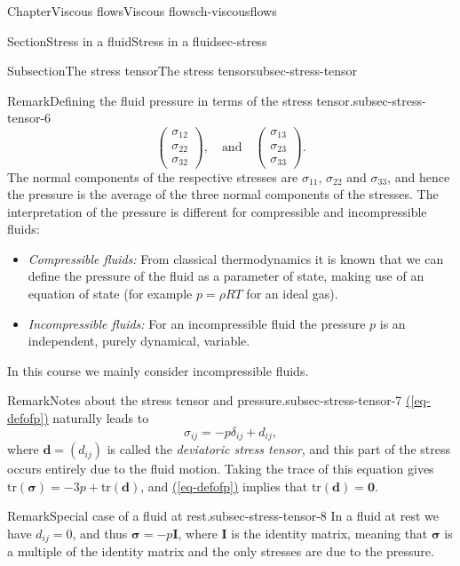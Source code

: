 \documentclass[oneside,10pt,]{book}
\newcommand{\xreffont}{\relax}
\newcommand{\ptxlistdisc}{\raisebox{0.3ex}{\textbullet}}
\numberwithin{equation}{section}
\newcommand{\bsigma}{\boldsymbol{\sigma}}
\newcommand{\bd}{\boldsymbol{d}}
\newcommand{\bI}{\boldsymbol{I}}
\begin{document}
\begin{chapterptx}{Chapter}{Viscous flows}{}{Viscous flows}{}{}{ch-viscousflows}
\begin{sectionptx}{Section}{Stress in a fluid}{}{Stress in a fluid}{}{}{sec-stress}
\begin{subsectionptx}{Subsection}{The stress tensor}{}{The stress tensor}{}{}{subsec-stress-tensor}
\begin{remark}{Remark}{Defining the fluid pressure in terms of the stress tensor.}{subsec-stress-tensor-6}
\begin{equation*}
\left(\begin{matrix}\sigma_{12}\\\sigma_{22}\\\sigma_{32}\end{matrix}\right),
\quad\textrm{and}\quad
\left(\begin{matrix}\sigma_{13}\\\sigma_{23}\\\sigma_{33}\end{matrix}\right).
\end{equation*}
The normal components of the respective stresses are \(\sigma_{11}\), \(\sigma_{22}\) and \(\sigma_{33}\), and hence the pressure is the average of the three normal components of the stresses. The interpretation of the pressure is different for compressible and incompressible fluids:%
\begin{itemize}[label=\ptxlistdisc]
\item{}\emph{Compressible fluids:} From classical thermodynamics it is known that we can define the pressure of the fluid as a parameter of state, making use of an equation of state (for example \(p=\rho RT\) for an ideal gas).%
\item{}\emph{Incompressible fluids:} For an incompressible fluid the pressure \(p\) is an independent, purely dynamical, variable.%
\end{itemize}
In this course we mainly consider incompressible fluids.%
\end{remark}
\begin{remark}{Remark}{Notes about the stress tensor and pressure.}{subsec-stress-tensor-7}%
\hyperref[eq-defofp]{({\xreffont\ref{eq-defofp}})} naturally leads to%
\begin{equation*}
\sigma_{ij}=-p \delta_{ij}+d_{ij},
\end{equation*}
where \(\bd=(d_{ij})\) is called the \emph{deviatoric stress tensor}, and this part of the stress occurs entirely due to the fluid motion. Taking the trace of this equation gives \(\textrm{tr}(\bsigma)=-3p+\textrm{tr}(\bd)\), and \hyperref[eq-defofp]{({\xreffont\ref{eq-defofp}})} implies that \(\textrm{tr}(\bd)=\boldsymbol{0}\).%
\end{remark}
\begin{remark}{Remark}{Special case of a fluid at rest.}{subsec-stress-tensor-8}%
In a fluid at rest we have \(d_{ij}=0\), and thus \(\bsigma=-p\bI\), where \(\bI\) is the identity matrix, meaning that \(\bsigma\) is a multiple of the identity matrix and the only stresses are due to the pressure.%

\end{remark}
\end{subsectionptx}
\end{sectionptx}
\end{chapterptx}
\end{document}
